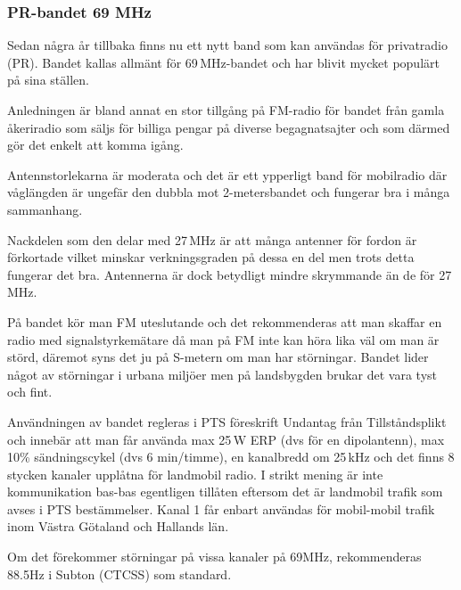\subsubsection{PR-bandet 69 MHz}

Sedan några år tillbaka finns nu ett nytt band som kan användas för
privatradio (PR). Bandet kallas allmänt för 69\,MHz-bandet och har
blivit mycket populärt på sina ställen.

Anledningen är bland annat en stor tillgång på FM-radio för bandet
från gamla åkeriradio som säljs för billiga pengar på diverse
begagnatsajter och som därmed gör det enkelt att komma igång.

Antennstorlekarna är moderata och det är ett ypperligt band för mobilradio där våglängden är ungefär den dubbla mot 2-metersbandet och fungerar bra i många sammanhang.

Nackdelen som den delar med 27\,MHz är att många antenner för fordon är förkortade vilket minskar verkningsgraden på dessa en del men trots detta fungerar det bra. Antennerna är dock betydligt mindre skrymmande än de för 27\,MHz.

På bandet kör man FM uteslutande och det rekommenderas att man skaffar en radio med signalstyrkemätare då man på FM inte kan höra lika väl om man är störd, däremot syns det ju på S-metern om man har störningar. Bandet lider något av störningar i urbana miljöer men på landsbygden brukar det vara tyst och fint.

Användningen av bandet regleras i PTS föreskrift Undantag från Tillståndsplikt och innebär att man får använda max 25\,W ERP (dvs för en dipolantenn), max 10\% sändningscykel (dvs 6 min/timme), en kanalbredd om 25\,kHz och det finns 8 stycken kanaler upplåtna för landmobil radio. I strikt mening är inte kommunikation bas-bas egentligen tillåten eftersom det är landmobil trafik som avses i PTS bestämmelser. Kanal 1 får enbart användas för mobil-mobil trafik inom Västra Götaland och Hallands län.

Om det förekommer störningar på vissa kanaler på 69MHz, rekommenderas 88.5Hz i Subton (CTCSS) som standard.

